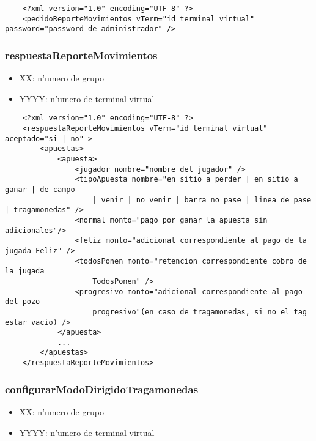 \begin{verbatim}
    <?xml version="1.0" encoding="UTF-8" ?>
    <pedidoReporteMovimientos vTerm="id terminal virtual" password="password de administrador" />
\end{verbatim}


\subsubsection{respuestaReporteMovimientos}
 
\begin{itemize}
    \item{XX: n'umero de grupo}
    \item{YYYY: n'umero de terminal virtual}
\end{itemize}

\begin{verbatim}
    <?xml version="1.0" encoding="UTF-8" ?>
    <respuestaReporteMovimientos vTerm="id terminal virtual" aceptado="si | no" >
        <apuestas>
            <apuesta>
                <jugador nombre="nombre del jugador" />
                <tipoApuesta nombre="en sitio a perder | en sitio a ganar | de campo
                    | venir | no venir | barra no pase | linea de pase | tragamonedas" />
                <normal monto="pago por ganar la apuesta sin adicionales"/>
                <feliz monto="adicional correspondiente al pago de la jugada Feliz" />
                <todosPonen monto="retencion correspondiente cobro de la jugada
                    TodosPonen" />
                <progresivo monto="adicional correspondiente al pago del pozo
                    progresivo"(en caso de tragamonedas, si no el tag estar vacio) />
            </apuesta>
            ...
        </apuestas>
    </respuestaReporteMovimientos>
\end{verbatim}


\subsubsection{configurarModoDirigidoTragamonedas}
 
\begin{itemize}
    \item{XX: n'umero de grupo}
    \item{YYYY: n'umero de terminal virtual}
\end{itemize}


